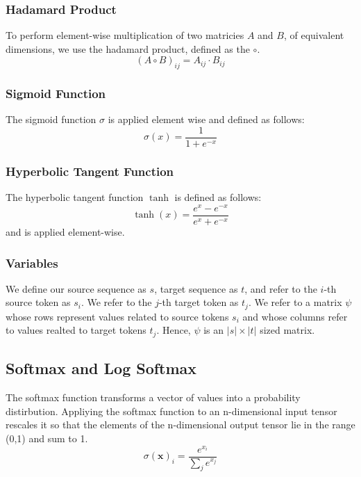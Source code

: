 \documentclass[twoside,twocolumn]{article}
\renewcommand{\vec}[1]{\mathbf{#1}}
\begin{document}
\subsubsection{Hadamard Product}

To perform element-wise multiplication of two matricies $A$ and $B$, of equivalent dimensions, we use the hadamard product, defined as the $\circ$.
\begin{equation}
  (A \circ B)_{ij} = A_{ij} \cdot B_{ij}
\end{equation}

\subsubsection{Sigmoid Function}

The sigmoid function $\sigma$ is applied element wise and defined as follows:
\begin{equation}
  \sigma(x) = \frac{1}{1+e^{-x}}
\end{equation}

\subsubsection{Hyperbolic Tangent Function}

The hyperbolic tangent function $\tanh$ is defined as follows:
\begin{equation}
  \tanh(x) = \frac{e^x - e^{-x}} {e^x + e^{-x}}
\end{equation}
and is applied element-wise.

\subsubsection{Variables}
We define our source sequence as $s$, target sequence as $t$, and refer to the $i$-th source token as $s_i$. We refer to the $j$-th target token as $t_j$. We refer to a matrix $\psi$ whose rows represent values related to source tokens $s_i$ and whose columns refer to values realted to target tokens $t_j$. Hence, $\psi$ is an $|s| \times |t|$ sized matrix.

\subsection{Softmax and Log Softmax}
The softmax function transforms a vector of values into a probability distirbution. Appliying the softmax function to an n-dimensional input tensor rescales it so that the elements of the n-dimensional output tensor lie in the range (0,1) and sum to 1.
\begin{equation}
  \sigma(\vec{x})_i = \frac{e^{x_i}}{\sum_j e^{x_j}}
\end{equation}
\end{document}
